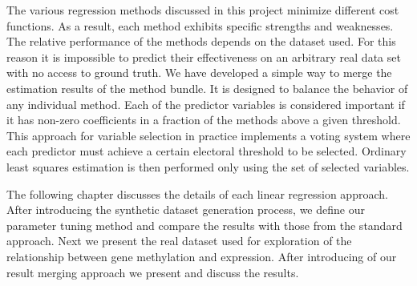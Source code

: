 The various regression methods discussed in this project minimize different cost functions. As a result, each method exhibits specific strengths and weaknesses. The relative performance of the methods depends on the dataset used. For this reason it is impossible to predict their effectiveness on an arbitrary real data set with no access to ground truth. We have developed a simple way to merge the estimation results of the method bundle. It is designed to balance the behavior of any individual method. Each of the predictor variables is considered important if it has non-zero coefficients in a fraction of the methods above a given threshold. This approach for variable selection in practice implements a voting system where each predictor must achieve a certain electoral threshold to be selected. Ordinary least squares estimation is then performed only using the set of selected variables.

The following chapter discusses the details of each linear regression approach. After introducing the synthetic dataset generation process, we define our parameter tuning method and compare the results with those from the standard approach. Next we present the real dataset used for exploration of the relationship between gene methylation and expression. After introducing of our result merging approach we present and discuss the results.